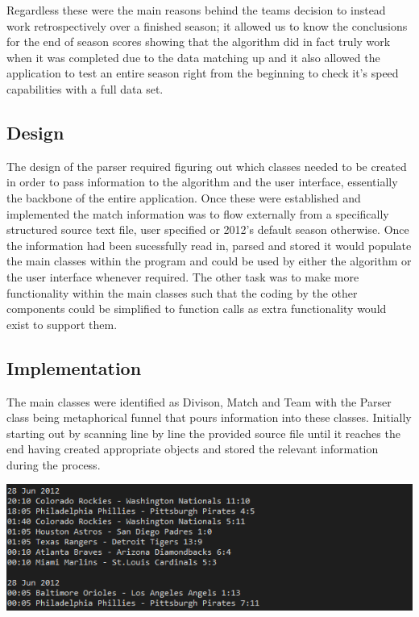 Regardless these were the main reasons behind the teams decision to
instead work retrospectively over a finished season; it allowed us to
know the conclusions for the end of season scores showing that the
algorithm did in fact truly work when it was completed due to the data
matching up and it also allowed the application to test an entire
season right from the beginning to check it's speed capabilities with
a full data set. 

\subsection{Design}
The design of the parser required figuring out which classes needed to
be created in order to pass information to the algorithm and the user
interface, essentially the backbone of the entire application. Once
these were established and implemented the match information was to
flow externally from a specifically structured source text file, user
specified or 2012's default season otherwise. Once the information had
been sucessfully read in, parsed and stored it would populate the main
classes within the program and could be used by either the algorithm
or the user interface whenever required. The other task was to make
more functionality within the main classes such that the coding by the
other components could be simplified to function calls as extra
functionality would exist to support them. 

\subsection{Implementation}

The main classes were identified as Divison, Match and Team with the
Parser class being metaphorical funnel that pours information into
these classes. Initially starting out by scanning line by line the
provided source file until it reaches the end having created
appropriate objects and stored the relevant information during the
process. 

\includegraphics[width=\linewidth,keepaspectratio]{images/sourceFileExample.png}

